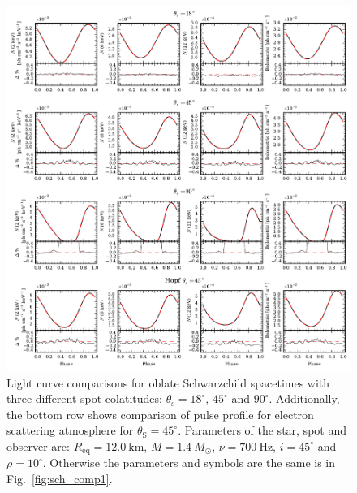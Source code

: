 \documentclass[iop, usenatbib]{emulateapj}
\newcommand{\Msun}{\ensuremath{M_{\odot}}}
\begin{document}



\begin{figure}
\centering
\includegraphics[width=18cm]{figs/fig4.pdf}
\caption{\label{fig:osch_comp700}
  Light curve comparisons for oblate Schwarzchild spacetimes with three different spot colatitudes: $\theta_{\mathrm{s}} = 18^{\circ}$, $45^{\circ}$ and $90^{\circ}$.
  Additionally, the bottom row shows comparison of pulse profile for electron scattering atmosphere for $\theta_{\mathrm{S}} = 45^{\circ}$.
  Parameters of the star, spot and observer are: $R_{\mathrm{eq}} = 12.0~\mathrm{km}$, $M = 1.4~\Msun$, $\nu = 700~\mathrm{Hz}$, $i = 45^{\circ}$ and $\rho = 10^{\circ}$.
  Otherwise the parameters and symbols are the same is in Fig.~\ref{fig:sch_comp1}.
  }
\end{figure}
\end{document}
